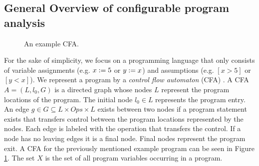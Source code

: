 \subsection{General Overview of configurable program analysis}
\begin{figure}
\lstset{numbers=left}
\begin{subfigure}[b]{.48\textwidth}

\end{subfigure}%
\hfill
\begin{subfigure}[b]{.48\textwidth}
\end{subfigure}
\caption{An example CFA.}
\label{fig:exCFA}
\end{figure}

For the sake of simplicity, we focus on a programming language that only consists of variable assignments (e.g. $x := 5$ or $y := x$) and assumptions (e.g. $[x > 5]$ or $[y < x]$).
We represent a program by a \emph{control flow automaton} (CFA) \cite{BeyerBook}\cite{Beyer2012a}.
A CFA $A = (L, l_0, G)$ is a directed graph whose nodes $L$ represent the program locations of the program.
The initial node $l_0 \in L$ represents the program entry.
An edge $g \in G \subseteq L \times Ops \times L$ exists between two nodes if a program statement exists that transfers control between the program locations represented by the nodes.
Each edge is labeled with the operation that transfers the control.
If a node has no leaving edges it is a final node. Final nodes represent the program exit.
A CFA for the previously mentioned example program can be seen in Figure \ref{fig:exCFA}.
The set $X$ is the set of all program variables occurring in a program.

